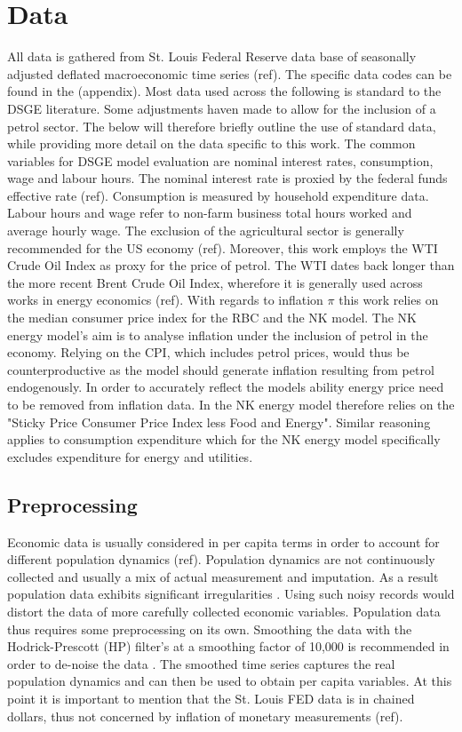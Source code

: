 \documentclass[12pt,a4paper,english]{article} %
\let\oldsection\section
\renewcommand\section{\clearpage\oldsection}
\begin{document}
	

	
	\section{Data}
	
	All data is gathered from St. Louis Federal Reserve data base of seasonally adjusted deflated macroeconomic time series (ref). The specific data codes can be found in the (appendix). Most data used across the following is standard to the DSGE literature. Some adjustments haven made to allow for the inclusion of a petrol sector. The below will therefore briefly outline the use of standard data, while providing more detail on the data specific to this work.
	The common variables for DSGE model evaluation are nominal interest rates, consumption, wage and labour hours. The nominal interest rate is proxied by the federal funds effective rate (ref). Consumption is measured by household expenditure data. Labour hours and wage refer to non-farm business total hours worked and average hourly wage. The exclusion of the agricultural sector is generally recommended for the US economy (ref). Moreover, this work employs the WTI Crude Oil Index as proxy for the price of petrol. The WTI dates back longer than the more recent Brent Crude Oil Index, wherefore it is generally used across works in energy economics (ref).
	With regards to inflation $\pi$ this work relies on the median consumer price index for the RBC and the NK model. The NK energy model's aim is to analyse inflation under the inclusion of petrol in the economy. Relying on the CPI, which includes petrol prices, would thus be counterproductive as the model should generate inflation resulting from petrol endogenously. In order to accurately reflect the models ability energy price need to be removed from inflation data. In the NK energy model therefore relies on the "Sticky Price Consumer Price Index less Food and Energy". Similar reasoning applies to consumption expenditure which for the NK energy model specifically excludes expenditure for energy and utilities.
	
	\subsection{Preprocessing}
	Economic data is usually considered in per capita terms in order to account for different population dynamics (ref). Population dynamics are not continuously collected and usually a mix of actual measurement and imputation. As a result population data exhibits significant irregularities \cite{pfeifer_guide_2021}. Using such noisy records would distort the data of more carefully collected economic variables. Population data thus requires some preprocessing on its own. Smoothing the data with the Hodrick-Prescott (HP) filter's at a smoothing factor of 10,000 is recommended in order to de-noise the data \cite{edge_judging_2013}. The smoothed time series captures the real population dynamics and can then be used to obtain per capita variables. At this point it is important to mention that the St. Louis FED data is in chained dollars, thus not concerned by inflation of monetary measurements (ref). 
	
\end{document}
